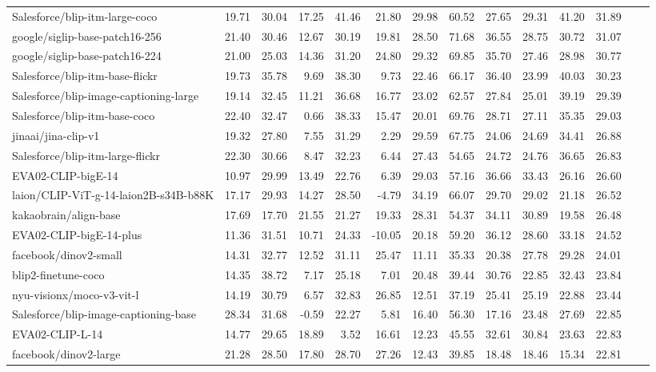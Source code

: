 \begin{table*}
{\begin{tabular}{lrrrrrrrrrrrrr}
Salesforce/blip-itm-large-coco &19.71 &30.04 &17.25 &41.46 &21.80 &29.98 &60.52 &27.65 &29.31 &41.20 &31.89 \\
google/siglip-base-patch16-256 &21.40 &30.46 &12.67 &30.19 &19.81 &28.50 &71.68 &36.55 &28.75 &30.72 &31.07 \\
google/siglip-base-patch16-224 &21.00 &25.03 &14.36 &31.20 &24.80 &29.32 &69.85 &35.70 &27.46 &28.98 &30.77 \\
Salesforce/blip-itm-base-flickr &19.73 &35.78 &9.69 &38.30 &9.73 &22.46 &66.17 &36.40 &23.99 &40.03 &30.23 \\
Salesforce/blip-image-captioning-large &19.14 &32.45 &11.21 &36.68 &16.77 &23.02 &62.57 &27.84 &25.01 &39.19 &29.39 \\
Salesforce/blip-itm-base-coco &22.40 &32.47 &0.66 &38.33 &15.47 &20.01 &69.76 &28.71 &27.11 &35.35 &29.03 \\
jinaai/jina-clip-v1 &19.32 &27.80 &7.55 &31.29 &2.29 &29.59 &67.75 &24.06 &24.69 &34.41 &26.88 \\
Salesforce/blip-itm-large-flickr &22.30 &30.66 &8.47 &32.23 &6.44 &27.43 &54.65 &24.72 &24.76 &36.65 &26.83 \\
EVA02-CLIP-bigE-14 &10.97 &29.99 &13.49 &22.76 &6.39 &29.03 &57.16 &36.66 &33.43 &26.16 &26.60 \\
laion/CLIP-ViT-g-14-laion2B-s34B-b88K &17.17 &29.93 &14.27 &28.50 &-4.79 &34.19 &66.07 &29.70 &29.02 &21.18 &26.52 \\
kakaobrain/align-base &17.69 &17.70 &21.55 &21.27 &19.33 &28.31 &54.37 &34.11 &30.89 &19.58 &26.48 \\
EVA02-CLIP-bigE-14-plus &11.36 &31.51 &10.71 &24.33 &-10.05 &20.18 &59.20 &36.12 &28.60 &33.18 &24.52 \\
facebook/dinov2-small &14.31 &32.77 &12.52 &31.11 &25.47 &11.11 &35.33 &20.38 &27.78 &29.28 &24.01 \\
blip2-finetune-coco &14.35 &38.72 &7.17 &25.18 &7.01 &20.48 &39.44 &30.76 &22.85 &32.43 &23.84 \\
nyu-visionx/moco-v3-vit-l &14.19 &30.79 &6.57 &32.83 &26.85 &12.51 &37.19 &25.41 &25.19 &22.88 &23.44 \\
Salesforce/blip-image-captioning-base &28.34 &31.68 &-0.59 &22.27 &5.81 &16.40 &56.30 &17.16 &23.48 &27.69 &22.85 \\
EVA02-CLIP-L-14 &14.77 &29.65 &18.89 &3.52 &16.61 &12.23 &45.55 &32.61 &30.84 &23.63 &22.83 \\
facebook/dinov2-large &21.28 &28.50 &17.80 &28.70 &27.26 &12.43 &39.85 &18.48 &18.46 &15.34 &22.81 \\

\end{tabular}}
\end{table*}
